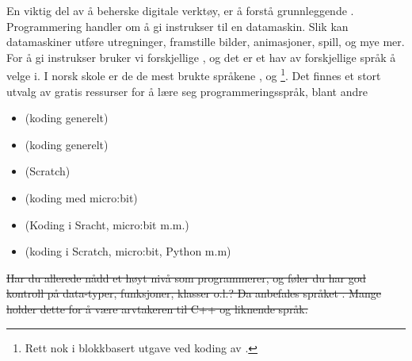 



En viktig del av å beherske digitale verktøy, er å forstå grunnleggende .	
Programmering handler om å gi instrukser til en datamaskin. Slik kan datamaskiner utføre utregninger, framstille bilder, animasjoner, spill, og mye mer. For å gi instrukser bruker vi forskjellige , og det er et hav av forskjellige språk å velge i. I norsk skole er de de mest brukte språkene ,  og \footnote{Rett nok i blokkbasert utgave ved koding av .}. Det finnes et stort utvalg av gratis ressurser for å lære seg programmeringsspråk, blant andre
\begin{itemize}
	\item {} (koding generelt)
	\item {} (koding generelt)
	\item {} (Scratch)
	\item {} (koding med micro:bit)
	\item {} (Koding i Sracht, micro:bit m.m.)
	\item {} (koding i Scratch, micro:bit, Python m.m)
\end{itemize} \vsk

\st{Har du allerede nådd et høyt nivå som programmerer, og føler du har god kontroll på data-typer, funksjoner, klasser o.l.? Da anbefales språket . Mange holder dette for å være arvtakeren til C++ og liknende språk.}



